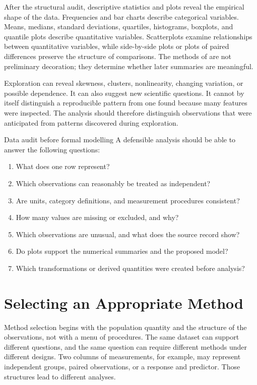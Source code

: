 After the structural audit, descriptive statistics and plots reveal the empirical shape of the data. Frequencies and bar charts describe categorical variables. Means, medians, standard deviations, quartiles, histograms, boxplots, and quantile plots describe quantitative variables. Scatterplots examine relationships between quantitative variables, while side-by-side plots or plots of paired differences preserve the structure of comparisons. The methods of  are not preliminary decoration; they determine whether later summaries are meaningful.

Exploration can reveal skewness, clusters, nonlinearity, changing variation, or possible dependence. It can also suggest new scientific questions. It cannot by itself distinguish a reproducible pattern from one found because many features were inspected. The analysis should therefore distinguish observations that were anticipated from patterns discovered during exploration.

\begin{custombox}{Data audit before formal modelling}
A defensible analysis should be able to answer the following questions:
\begin{enumerate}
  \item What does one row represent?
  \item Which observations can reasonably be treated as independent?
  \item Are units, category definitions, and measurement procedures consistent?
  \item How many values are missing or excluded, and why?
  \item Which observations are unusual, and what does the source record show?
  \item Do plots support the numerical summaries and the proposed model?
  \item Which transformations or derived quantities were created before analysis?
\end{enumerate}
\end{custombox}

\section{Selecting an Appropriate Method}
\label{sec:integrated-method-selection}

Method selection begins with the population quantity and the structure of the observations, not with a menu of procedures. The same dataset can support different questions, and the same question can require different methods under different designs. Two columns of measurements, for example, may represent independent groups, paired observations, or a response and predictor. Those structures lead to different analyses.

